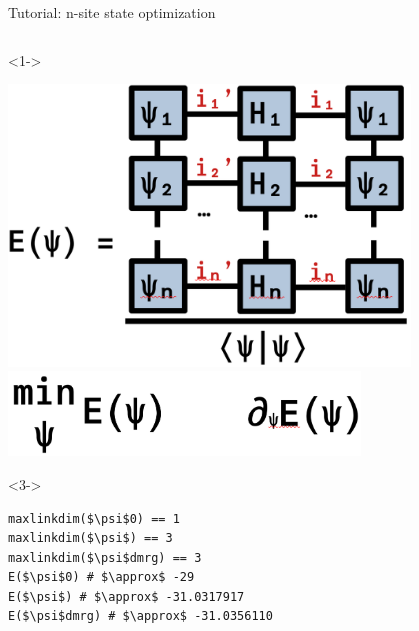 \begin{frame}[fragile]{Tutorial: n-site state optimization}
\begin{columns}
\begin{column}{5.5cm}
\begin{onlyenv}<1->
\vspace*{0.0cm}
\begin{center}
\includegraphics[width=0.8\textwidth]{
  slides/assets/psin_H_psin.png
} \\
\includegraphics[width=0.7\textwidth]{
  slides/assets/min_grad_E_psi.png
}
\end{center}
\vspace*{0.0cm}
\end{onlyenv}

\begin{onlyenv}<3->
\begin{lstlisting}[language=JuliaLocal, style=julia, mathescape, basicstyle=\scriptsize\ttfamily]
maxlinkdim($\psi$0) == 1
maxlinkdim($\psi$) == 3
maxlinkdim($\psi$dmrg) == 3
E($\psi$0) # $\approx$ -29
E($\psi$) # $\approx$ -31.0317917
E($\psi$dmrg) # $\approx$ -31.0356110
\end{lstlisting}
~\\
~\\
\end{onlyenv}


\end{column}

\end{columns}

\end{frame}
